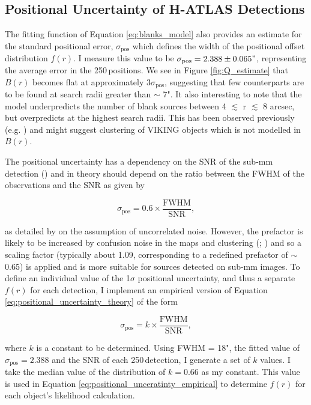 \subsection{Positional Uncertainty of H-ATLAS Detections}

The fitting function of Equation \ref{eq:blanks_model} also provides an estimate for the standard positional error, $\sigma_{\textrm{pos}}$ which defines the width of the positional offset distribution $f(r)$. I measure this value to be $\sigma_{\textrm{pos}} = 2.388\pm0.065"$, representing the average error in the 250\,\micron positions. We see in Figure \ref{fig:Q_estimate} that $B(r)$ becomes flat at approximately 3$\sigma_{\textrm{pos}}$, suggesting that few counterparts are to be found at search radii greater than $\sim$ 7". It also interesting to note that the model underpredicts the number of blank sources between 4 $\lesssim$ r $\lesssim$ 8 arcsec, but overpredicts at the highest search radii. This has been observed previously (e.g. \citealt{Fleuren_2012}) and might suggest clustering of VIKING objects which is not modelled in $B(r)$.

The positional uncertainty has a dependency on the SNR of the sub-mm detection (\citealt{Bourne_2016}) and in theory should depend on the ratio between the FWHM of the observations and the SNR as given by

\begin{equation}
    \sigma_{\textrm{pos}} = 0.6\times\frac{\textrm{FWHM}}{\textrm{SNR}},
\label{eq:positional_uncertainty_theory}
\end{equation}

as detailed by \citealt{Ivison_2007} on the assumption of uncorrelated noise. However, the prefactor is likely to be increased by confusion noise in the maps and clustering (\citealt{Chapin_2011}; \citealt{Bourne_2014}) and so a scaling factor (typically about 1.09, corresponding to a redefined prefactor of $\sim$ 0.65) is applied and is more suitable for sources detected on sub-mm images. To define an individual value of the 1$\sigma$ positional uncertainty, and thus a separate $f(r)$ for each detection, I implement an empirical version of Equation \ref{eq:positional_uncertainty_theory} of the form

\begin{equation}
    \sigma_{\textrm{pos}} = k\times\frac{\textrm{FWHM}}{\textrm{SNR}},
\label{eq:positional_unceratinty_empirical}
\end{equation}

where $k$ is a constant to be determined. Using FWHM = 18", the fitted value of $\sigma_{\textrm{pos}} = 2.388$ and  the SNR of each 250\,\micron detection, I generate a set of $k$ values. I take the median value of the distribution of $k = 0.66$ as my constant. This value is used in Equation \ref{eq:positional_unceratinty_empirical} to determine $f(r)$ for each object's likelihood calculation.

